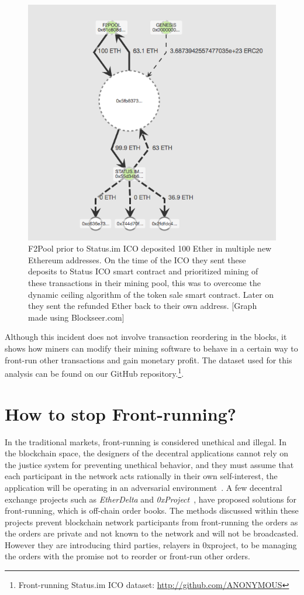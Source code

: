 \begin{figure}[h]
\centering
\includegraphics[width=0.7\linewidth]{figures/F2Pool_transactions_to_StatusICO_and_Refunds.png}
\caption{F2Pool prior to Status.im ICO deposited 100 Ether in multiple new Ethereum addresses. On the time of the ICO they sent these deposits to Status ICO smart contract and prioritized mining of these transactions in their mining pool, this was to overcome the dynamic ceiling algorithm of the token sale smart contract. Later on they sent the refunded Ether back to their own address. [Graph made using Blockseer.com] \label{fig:f2poolfront-run}}
\end{figure}


Although this incident does not involve transaction reordering in the blocks, it shows how miners can modify their mining software to behave in a certain way to front-run other transactions and gain monetary profit. The dataset used for this analysis can be found on our GitHub repository.\footnote{Front-running Status.im ICO dataset: \url{http://github.com/ANONYMOUS}}. 

\section{How to stop Front-running?} %

In the traditional markets, front-running is considered unethical and illegal. In the blockchain space, the designers of the decentral applications cannot rely on the justice system for preventing unethical behavior, and they must assume that each participant in the network acts rationally in their own self-interest, the application will be operating in an adversarial environment~\cite{0xfrontrunning:online}.
A few decentral exchange projects such as \textit{EtherDelta} and \textit{0xProject}~\cite{warren20170x}, have proposed solutions for front-running, which is off-chain order books. The methods discussed within these projects prevent blockchain network participants from front-running the orders as the orders are private and not known to the network and will not be broadcasted. However they are introducing third parties, \eg relayers in 0xproject, to be managing the orders with the promise not to reorder or front-run other orders. 

